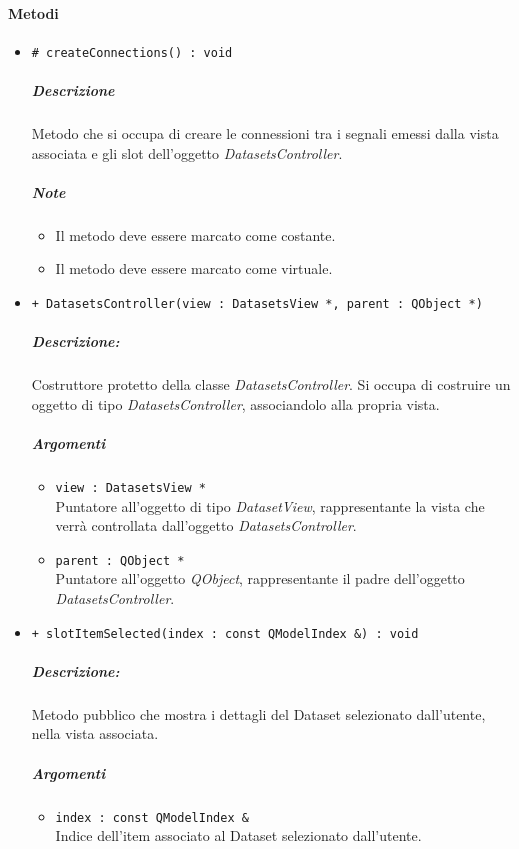 	\paragraph{\color{black}Metodi}
		\begin{itemize}
			\item \color{blue} \verb!# createConnections() : void!
			\color{black}
			\subparagraph{Descrizione} Metodo che si occupa di creare le connessioni tra i segnali emessi dalla vista associata e gli slot\g{} dell'oggetto \textsl{DatasetsController}.
			\subparagraph{Note}
			\begin{itemize}
				\item Il metodo deve essere marcato come costante.
				\item Il metodo deve essere marcato come virtuale.
			\end{itemize}
			\item \color{blue} \verb!+ DatasetsController(view : DatasetsView *, parent : QObject *)!
			\color{black}
			\subparagraph{Descrizione:} Costruttore protetto della classe \textsl{DatasetsController}. Si occupa di costruire un oggetto di tipo \textsl{DatasetsController}, associandolo alla propria vista.
			\color{black}
			\subparagraph{Argomenti}
			\begin{itemize}
				\item \color{RoyalPurple} \verb!view : DatasetsView *!\\				
\color{black} Puntatore all'oggetto di tipo \textsl{DatasetView}, rappresentante la vista che verrà controllata dall'oggetto \textsl{DatasetsController}.
				\item \color{RoyalPurple} \verb!parent : QObject *!\\				
\color{black} Puntatore all'oggetto \textsl{QObject}, rappresentante il padre dell'oggetto \textsl{DatasetsController}.
			\end{itemize}
			\item \color{blue} \verb!+ slotItemSelected(index : const QModelIndex &) : void!
			\color{black}
			\subparagraph{Descrizione:} Metodo pubblico che mostra i dettagli del Dataset\g{} selezionato dall'utente, nella vista associata.
			\color{black}
			\subparagraph{Argomenti}
			\begin{itemize}
				\item \color{RoyalPurple} \verb!index : const QModelIndex &!\\				
\color{black} Indice dell'item associato al Dataset\g{} selezionato dall'utente.
			\end{itemize}

\end{itemize}
